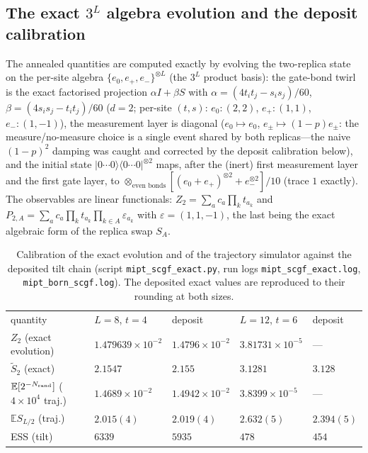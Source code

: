 \documentclass[aps,prx,reprint,superscriptaddress,nobibnotes,longbibliography]{revtex4-2}
\newcommand{\E}{\mathbb E}
\begin{document}
\subsection{The exact $3^L$ algebra evolution and the deposit calibration}

The annealed quantities are computed exactly by evolving the two-replica
state on the per-site algebra $\{e_0,e_+,e_-\}^{\otimes L}$ (the $3^L$
product basis): the gate-bond twirl is the exact factorised projection
$\alpha I+\beta S$ with $\alpha=(4t_it_j-s_is_j)/60$,
$\beta=(4s_is_j-t_it_j)/60$ ($d=2$; per-site $(t,s)$: $e_0\colon(2,2)$,
$e_+\colon(1,1)$, $e_-\colon(1,-1)$), the measurement layer is diagonal
($e_0\mapsto e_0$, $e_\pm\mapsto(1-p)e_\pm$: the measure/no-measure
choice is a single event shared by both replicas---the naive $(1-p)^2$
damping was caught and corrected by the deposit calibration below), and
the initial state $|0\cdots0\rangle\langle0\cdots0|^{\otimes2}$ maps,
after the (inert) first measurement layer and the first gate layer, to
$\otimes_{\text{even bonds}}[(e_0+e_+)^{\otimes2}+e_-^{\otimes2}]/10$
(trace $1$ exactly).  The observables are linear functionals:
$Z_2=\sum_a c_a\prod_k t_{a_k}$ and
$P_{2,A}=\sum_a c_a\prod_k t_{a_k}\prod_{k\in A}\varepsilon_{a_k}$ with
$\varepsilon=(1,1,-1)$, the last being the exact algebraic form of the
replica swap $S_A$.

\begin{table}[t]
\caption{Calibration of the exact evolution and of the trajectory
simulator against the deposited tilt chain (script
\texttt{mipt\_scgf\_exact.py}, run logs
\texttt{mipt\_scgf\_exact.log}, \texttt{mipt\_born\_scgf.log}).  The
deposited exact values are reproduced to their rounding at both sizes.}
\label{tabS:calib}
\begin{ruledtabular}
\begin{tabular}{lllll}
quantity & $L=8$, $t=4$ & deposit & $L=12$, $t=6$ & deposit\\
\colrule
$Z_2$ (exact evolution) & $1.479639\times10^{-2}$ & $1.4796\times10^{-2}$
 & $3.81731\times10^{-5}$ & ---\\
$\tilde S_2$ (exact) & $2.1547$ & $2.155$ & $3.1281$ & $3.128$\\
$\E[2^{-N_{\rm rand}}]$ ($4\times10^4$ traj.) & $1.4689\times10^{-2}$
 & $1.4942\times10^{-2}$ & $3.8399\times10^{-5}$ & ---\\
$\E S_{L/2}$ (traj.) & $2.015(4)$ & $2.019(4)$ & $2.632(5)$ & $2.394(5)$\\
ESS (tilt) & $6339$ & $5935$ & $478$ & $454$\\
\end{tabular}
\end{ruledtabular}
\end{table}
\end{document}
